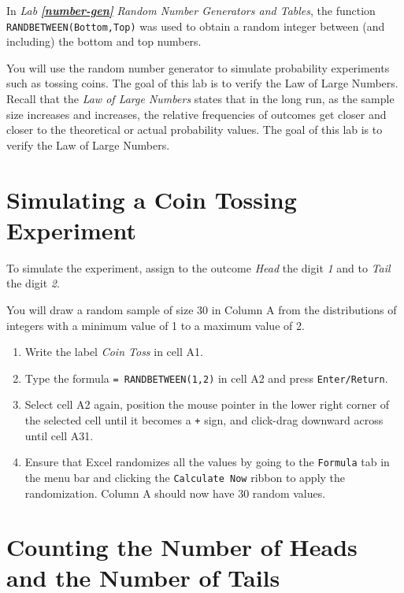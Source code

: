 \documentclass[
  12pt,
  letterpaper,
]{book}
\providecommand{\tightlist}{%
  \setlength{\itemsep}{0pt}\setlength{\parskip}{0pt}}
\begin{document}
In \emph{Lab} \textbf{\emph{\ref{number-gen}}} \emph{Random Number Generators and Tables}, the function \texttt{RANDBETWEEN(Bottom,Top)} was used to obtain a random integer between (and including) the bottom and top numbers.

You will use the random number generator to simulate probability experiments such as tossing coins. The goal of this lab is to verify the Law of Large Numbers. Recall that the \emph{Law of Large Numbers} states that in the long run, as the sample size increases and increases, the relative frequencies of outcomes get closer and closer to the theoretical or actual probability values. The goal of this lab is to verify the Law of Large Numbers.

\hypertarget{simulating-a-coin-tossing-experiment}{%
\section{Simulating a Coin Tossing Experiment}\label{simulating-a-coin-tossing-experiment}}

To simulate the experiment, assign to the outcome \emph{Head} the digit \emph{1} and to \emph{Tail} the digit \emph{2}.

You will draw a random sample of size 30 in Column A from the distributions of integers with a minimum value of 1 to a maximum value of 2.

\begin{enumerate}
\def\labelenumi{\arabic{enumi}.}
\tightlist
\item
  Write the label \emph{Coin Toss} in cell A1.
\item
  Type the formula \texttt{=\ RANDBETWEEN(1,2)} in cell A2 and press \texttt{Enter/Return}.
\item
  Select cell A2 again, position the mouse pointer in the lower right corner of the selected cell until it becomes a \texttt{+} sign, and click-drag downward across until cell A31.
\item
  Ensure that Excel randomizes all the values by going to the \texttt{Formula} tab in the menu bar and clicking the \texttt{Calculate\ Now} ribbon to apply the randomization. Column A should now have 30 random values.
\end{enumerate}

\hypertarget{counting-the-number-of-heads-and-the-number-of-tails}{%
\section{Counting the Number of Heads and the Number of Tails}\label{counting-the-number-of-heads-and-the-number-of-tails}}
\end{document}
